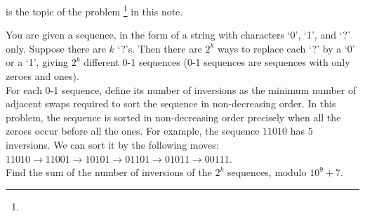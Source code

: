  is the topic of the problem \footnote{} in this note.

\begin{fullwidth}

\vspace{10 mm}
\begin{problem}
You are given a sequence, in the form of a string with characters `0', `1', and `?' only. Suppose there are $k$ `?'s. Then there are $2^k$ ways to replace each `?' by a `0' or a `1', giving $2 ^k$ different 0-1 sequences (0-1 sequences are sequences with only zeroes and ones).
\\
For each 0-1 sequence, define its number of inversions as the minimum number of adjacent swaps required to sort the sequence in non-decreasing order. In this problem, the sequence is sorted in non-decreasing order precisely when all the zeroes occur before all the ones. For example, the sequence $11010$ has $5$ inversions. We can sort it by the following moves: $11010 \rightarrow 11001 \rightarrow 10101 \rightarrow 01101 \rightarrow 01011 \rightarrow 00111$.
\\
Find the sum of the number of inversions of the $2^k$ sequences, $\text{modulo } 10^9+7$.
\end{problem}
\end{fullwidth}

